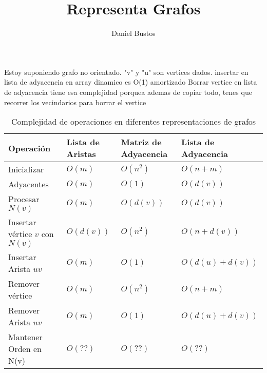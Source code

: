 \documentclass{article}
\title{Representa Grafos}
\author{Daniel Bustos}
\begin{document}
\maketitle
Estoy suponiendo grafo no orientado. "v" y "u" son vertices dados.  insertar en lista de adyacencia en array dinamico  es O(1) amortizado
Borrar vertice en lista de adyacencia tiene esa complejidad porquea ademas de copiar todo, tenes que recorrer los vecindarios para borrar el vertice

\begin{table}[h]
\centering
\begin{tabular}{|l|l|l|l|}
\hline
\textbf{Operación} & \textbf{Lista de Aristas} & \textbf{Matriz de Adyacencia} & \textbf{Lista de Adyacencia} \\
\hline
Inicializar & $O(m)$ & $O(n^2)$ & $O(n + m)$ \\
Adyacentes & $O(m)$ & $O(1)$ & $O(d(v))$ \\
Procesar $N(v)$ & $O(m)$ & $O(d(v))$ & $O(d(v))$ \\
Insertar vértice $v$ con $N(v)$ & $O(d(v))$ & $O(n^2)$ & $O(n + d(v))$ \\
Insertar Arista $uv$ & $O(m)$ & $O(1)$ & $O(d(u) + d(v))$ \\
Remover vértice & $O(m)$ & $O(n^2)$ & $O(n + m)$ \\
Remover Arista $uv$ & $O(m)$ & $O(1)$ & $O(d(u) + d(v))$ \\
Mantener Orden en N(v) & $O(??) $ & $O(??)$ & $O(??)$ \\
\hline
\end{tabular}
\caption{Complejidad de operaciones en diferentes representaciones de grafos}
\end{table}
\end{document}
